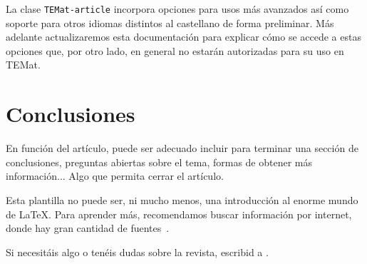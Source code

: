 \documentclass[bibtex]{TEMat-article}
\begin{document}
La clase \verb+TEMat-article+ incorpora opciones para usos más avanzados así como soporte para otros idiomas distintos al castellano de forma preliminar.
Más adelante actualizaremos esta documentación para explicar cómo se accede a estas opciones que, por otro lado, en general no estarán autorizadas para su uso en TEMat.


\section{Conclusiones}

En función del artículo, puede ser adecuado incluir para terminar una sección de conclusiones, preguntas abiertas sobre el tema, formas de obtener más información...
Algo que permita cerrar el artículo.

Esta plantilla no puede ser, ni mucho menos, una introducción al enorme mundo de \LaTeX.
Para aprender más, recomendamos buscar información por internet, donde hay gran cantidad de fuentes~\cite{wiki:latex, stackexchange, texample}.

Si necesitáis algo o tenéis dudas sobre la revista, escribid a .

\nocite{*}
\printbibliography[heading=bibintoc]
\end{document}
